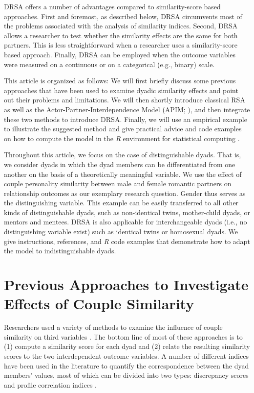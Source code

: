 \documentclass[jou,a4paper,draftfirst]{apa6}
\begin{document}
DRSA offers a number of advantages compared to similarity-score based approaches. 
First and foremost, as described below, DRSA circumvents most of the problems associated with the analysis of similarity indices. Second, DRSA allows a researcher to test whether the similarity effects are the same for both partners. This is less straightforward when a researcher uses a similarity-score based approach. Finally, DRSA can be employed when the outcome variables were measured on a continuous or on a categorical (e.g., binary) scale.

This article is organized as follows: We will first briefly discuss some previous approaches that have been used to examine dyadic similarity effects and point out their problems and limitations. We will then shortly introduce classical RSA as well as the Actor-Partner-Interdependence Model (APIM; ), and then integrate these two methods to introduce DRSA. Finally, we will use an empirical example to illustrate the suggested method and give practical advice and code examples on how to compute the model in the \emph{R} environment for statistical computing \parencite{r_core_team_r:_2014}.

Throughout this article, we focus on the case of distinguishable dyads. That is, we consider dyads in which the dyad members can be differentiated from one another on the basis of a theoretically meaningful variable. We use the effect of couple personality similarity between male and female romantic partners on relationship outcomes as our exemplary research question. Gender thus serves as the distinguishing variable. This example can be easily transferred to all other kinds of distinguishable dyads, such as non-identical twins, mother-child dyads, or mentors and mentees. DRSA is also applicable for interchangeable dyads (i.e., no distinguishing variable exist) such as identical twins or homosexual dyads. We give instructions, references, and \textit{R} code examples that demonstrate how to adapt the model to indistinguishable dyads. 

\section{Previous Approaches to Investigate Effects of Couple Similarity}
Researchers used a variety of methods to examine the influence of couple similarity on third variables \parencite[see][for an overview]{kenny_dyadic_2006}. The bottom line of most of these approaches is to (1) compute a similarity score for each dyad and (2) relate the resulting similarity scores to the two interdependent outcome variables. A number of different indices have been used in the literature to quantify the correspondence between the dyad members' values, most of which can be divided into two types: discrepancy scores and profile correlation indices \parencite[see also][]{DyrenforthEtAl2010}.
\end{document}
